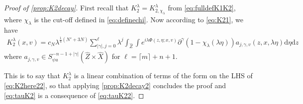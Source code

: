 \documentclass[
	fontsize=11pt, 
	twoside=false, 
	abstract=true, 
	a4paper,
]{scrartcl}
\newcommand{\dd}{\mathrm{d}}
\newcommand{\abs}[1]{\left\lvert#1\right\rvert}
\newcommand{\del}{\partial}
\begin{document}
\begin{proof}[Proof of \cref{prop:K2decay}]
	First recall that $K_2^\lambda = K_{2,\chi_\lambda}^\lambda$ from \cref{eq:fulldefK1K2}, where $\chi_\lambda$ is the cut-off defined in \cref{eq:definechi}. Now according to \cref{eq:K21}, we have %
	\begin{equation*}
		\begin{aligned}%
			K_2^\lambda(x,v) = c_{N}\lambda^{\frac{1}{4}(N'+3N)}\sum_{\abs{\gamma},j=0}^{\ell} \lambda^j \int_{\hat Z}\int e^{i\lambda\Phi(z,\eta;x,v)} \del^\gamma (1-\chi_{\lambda}(\lambda\eta)) a_{j,\gamma,v}(z,x,\lambda\eta)\dd\eta\dd z%
	\end{aligned}
\end{equation*}
	where $a_{j,\gamma,v} \in S^{-n-1+\abs{\gamma}}_{\psi a}(\hat Z\times \hat X)$ for $\ell =\lceil m\rceil+n+1$. %


	This is to say that $K_2^\lambda$ is a linear combination of terms of the form on the LHS of \cref{eq:K2here22}, so that applying \cref{prop:K2decay2} concludes the proof and \cref{eq:tauK2} is a consequence of \cref{eq:tauK22}.
\end{proof}
\end{document}
